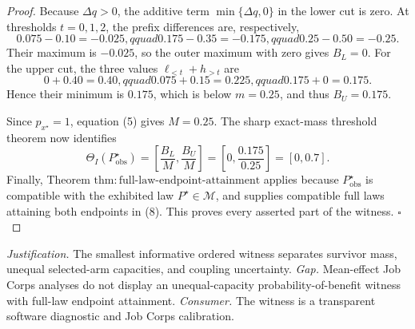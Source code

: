 \documentclass{article}
\begin{document}
\begin{proof}
Because \(\Delta q>0\), the additive term
\(\min\{\Delta q,0\}\) in the lower cut is zero.  At thresholds
\(t=0,1,2\), the prefix differences are, respectively,
\[
0.075-0.10=-0.025,qquad
0.175-0.35=-0.175,qquad
0.25-0.50=-0.25.
\tag{6}
\]
Their maximum is \(-0.025\), so the outer maximum with zero gives
\(B_L=0\).  For the upper cut, the three values
\(\ell_{<t}+h_{>t}\) are
\[
0+0.40=0.40,qquad
0.075+0.15=0.225,qquad
0.175+0=0.175.
\tag{7}
\]
Hence their minimum is \(0.175\), which is below \(m=0.25\), and thus
\(B_U=0.175\).

Since \(p_{x^{\star}}=1\), equation (5) gives \(M=0.25\).  The sharp
exact-mass threshold theorem now identifies
\[
\Theta_I(P_{\mathrm{obs}}^{\star})
=\left[\frac{B_L}{M},\frac{B_U}{M}\right]
=\left[0,\frac{0.175}{0.25}\right]=[0,0.7].
\tag{8}
\]
Finally, Theorem
\(\mathrm{thm{:}full\text{-}law\text{-}endpoint\text{-}attainment}\)
applies because \(P_{\mathrm{obs}}^{\star}\) is compatible with the
exhibited law \(P^{\star}\in\mathcal M\), and supplies compatible full
laws attaining both endpoints in (8).  This proves every asserted part of
the witness. \(\square\)
\end{proof}
\par\smallskip\noindent \textit{Justification.} The smallest informative ordered witness separates survivor mass, unequal selected-arm capacities, and coupling uncertainty. \textit{Gap.} Mean-effect Job Corps analyses do not display an unequal-capacity probability-of-benefit witness with full-law endpoint attainment. \textit{Consumer.} The witness is a transparent software diagnostic and Job Corps calibration.
\end{document}
